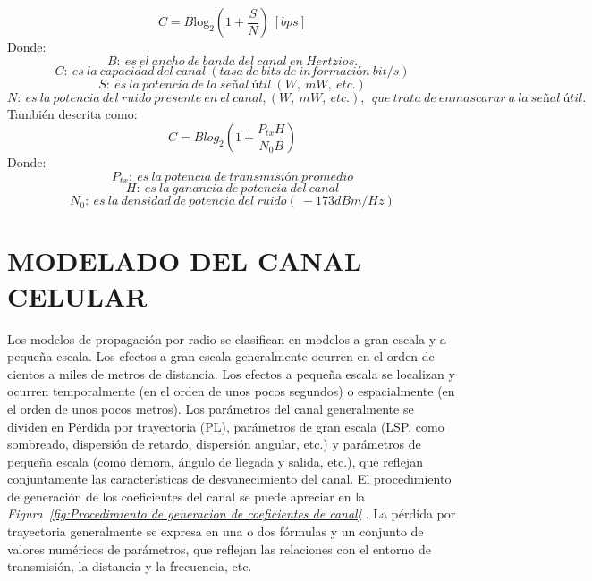 \begin{equation}
C=B{{\mathrm{log}}_2 \left(1+\frac{S}{N}\right)\   [bps] }
\label{eqn:Shannon}
\end{equation}
Donde:
\[B:\ es\ el\ ancho\ de\ banda\ del\ canal\ en\ Hertzios.\]
\[C:\ es\ la\ capacidad\ del\ canal\ (tasa\ de\ bits\ de\ informaci\textrm{ó}n\ bit/s)\]
\[S:\ es\ la\ potencia\ de\ la\ se\textrm{\~{n}}al\ \textrm{ú}til\ (W,\ mW,\ etc.)\]
\[N:\ es\ la\ potencia\ del\ ruido\ presente\ en\ el\ canal,\left(W,\ mW,\ etc.\right),\ \ que\ trata\ de\ enmascarar\ a\ la\ se\textrm{\~{n}}al\ \textrm{ú}til.\] 
También descrita como:
\begin{equation}
    C =Blog_2(1 + \frac {P_{tx} H}{N_0B})
    \label{eqn:Shannon2}
\end{equation}
Donde:
\[P_{tx}:\ es\ la\ potencia\ de\ transmisión\ promedio\]
\[H:\ es\ la\ ganancia\ de\ potencia\ del\ canal\]
\[N_0:\ es\ la\ densidad\ de\ potencia\ del\ ruido (~-173 dBm/Hz)\]

\section{MODELADO DEL CANAL CELULAR}

Los modelos de propagación por radio se clasifican en modelos a gran escala y a pequeña escala. Los efectos a gran escala generalmente ocurren en el orden de cientos a miles de metros de distancia. Los efectos a pequeña escala se localizan y ocurren temporalmente (en el orden de unos pocos segundos) o espacialmente (en el orden de unos pocos metros). Los parámetros del canal generalmente se dividen en Pérdida por trayectoria (PL), parámetros de gran escala (LSP, como sombreado, dispersión de retardo, dispersión angular, etc.) y parámetros de pequeña escala (como demora, ángulo de llegada y salida, etc.), que reflejan conjuntamente las características de desvanecimiento del canal. El procedimiento de generación de los coeficientes del canal se puede apreciar en la \textit{Figura~\ref{fig:Procedimiento de generacion de coeficientes de canal} }. La pérdida por trayectoria generalmente se expresa en una o dos fórmulas y un conjunto de valores numéricos de parámetros, que reflejan las relaciones con el entorno de transmisión, la distancia y la frecuencia, etc. \newline

